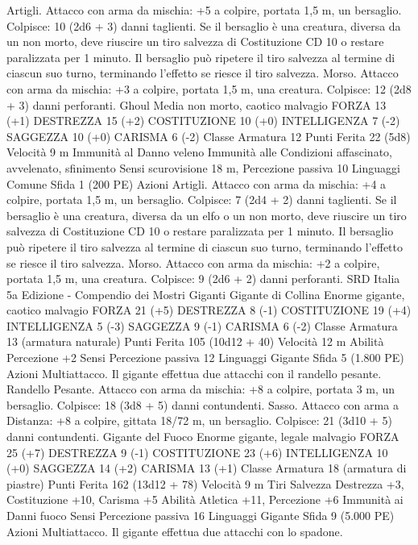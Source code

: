 \begin{multicols}{2}
Artigli. Attacco con arma da mischia: +5 a colpire, portata 1,5
m, un bersaglio.
Colpisce: 10 (2d6 + 3) danni taglienti. Se il bersaglio è una
creatura, diversa da un non morto, deve riuscire un tiro salvezza
di Costituzione CD 10 o restare paralizzata per 1 minuto. Il
bersaglio può ripetere il tiro salvezza al termine di ciascun suo
turno, terminando l’effetto se riesce il tiro salvezza.
Morso. Attacco con arma da mischia: +3 a colpire, portata 1,5
m, una creatura.
Colpisce: 12 (2d8 + 3) danni perforanti.
Ghoul
Media non morto, caotico malvagio
FORZA 13 (+1)
DESTREZZA 15 (+2)
COSTITUZIONE 10 (+0)
INTELLIGENZA 7 (-2)
SAGGEZZA 10 (+0)
CARISMA 6 (-2)
Classe Armatura 12
Punti Ferita 22 (5d8)
Velocità 9 m
Immunità al Danno veleno
Immunità alle Condizioni affascinato, avvelenato, sfinimento
Sensi scurovisione 18 m, Percezione passiva 10
Linguaggi Comune
Sfida 1 (200 PE)
Azioni
Artigli. Attacco con arma da mischia: +4 a colpire, portata 1,5
m, un bersaglio.
Colpisce: 7 (2d4 + 2) danni taglienti. Se il bersaglio è una
creatura, diversa da un elfo o un non morto, deve riuscire un tiro
salvezza di Costituzione CD 10 o restare paralizzata per 1
minuto. Il bersaglio può ripetere il tiro salvezza al termine di
ciascun suo turno, terminando l’effetto se riesce il tiro salvezza.
Morso. Attacco con arma da mischia: +2 a colpire, portata 1,5
m, una creatura.
Colpisce: 9 (2d6 + 2) danni perforanti.
SRD Italia 5a Edizione - Compendio dei Mostri
Giganti
Gigante di Collina
Enorme gigante, caotico malvagio
FORZA 21 (+5)
DESTREZZA 8 (-1)
COSTITUZIONE 19 (+4)
INTELLIGENZA 5 (-3)
SAGGEZZA 9 (-1)
CARISMA 6 (-2)
Classe Armatura 13 (armatura naturale)
Punti Ferita 105 (10d12 + 40)
Velocità 12 m
Abilità Percezione +2
Sensi Percezione passiva 12
Linguaggi Gigante
Sfida 5 (1.800 PE)
Azioni
Multiattacco. Il gigante effettua due attacchi con il randello pesante.
Randello Pesante. Attacco con arma da mischia: +8 a colpire,
portata 3 m, un bersaglio.
Colpisce: 18 (3d8 + 5) danni contundenti.
Sasso. Attacco con arma a Distanza: +8 a colpire, gittata 18/72
m, un bersaglio.
Colpisce: 21 (3d10 + 5) danni contundenti.
Gigante del Fuoco
Enorme gigante, legale malvagio
FORZA 25 (+7)
DESTREZZA 9 (-1)
COSTITUZIONE 23 (+6)
INTELLIGENZA 10 (+0)
SAGGEZZA 14 (+2)
CARISMA 13 (+1)
Classe Armatura 18 (armatura di piastre)
Punti Ferita 162 (13d12 + 78)
Velocità 9 m
Tiri Salvezza Destrezza +3, Costituzione +10, Carisma +5
Abilità Atletica +11, Percezione +6
Immunità ai Danni fuoco
Sensi Percezione passiva 16
Linguaggi Gigante
Sfida 9 (5.000 PE)
Azioni
Multiattacco. Il gigante effettua due attacchi con lo spadone.

\end{multicols}
